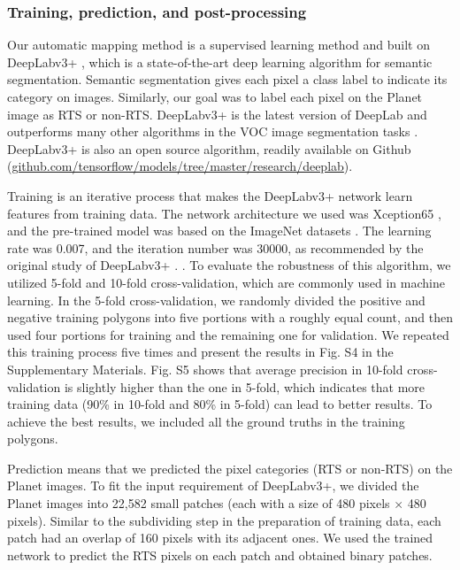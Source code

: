 \documentclass[authoryear,preprint,review,12pt]{elsarticle}
\begin{document}
\subsubsection{Training, prediction, and post-processing}
\label{subsubsec_deeplab}

Our automatic mapping method is a supervised learning method and built on DeepLabv3+ \citep{chen_encoder-decoder_2018}, which is a state-of-the-art deep learning algorithm for semantic segmentation. Semantic segmentation gives each pixel a class label to indicate its category on images. Similarly, our goal was to label each pixel on the Planet image as RTS or non-RTS. DeepLabv3+ is the latest version of DeepLab and outperforms  many other algorithms in the  VOC image segmentation tasks \citep{everingham_pascal_2015}. DeepLabv3+ is also an open source algorithm, readily available on Github (\url{github.com/tensorflow/models/tree/master/research/deeplab}).

Training is an iterative process that makes the DeepLabv3+ network learn features from training data. The network architecture we used was Xception65 \citep{chollet2017xception}, and the pre-trained model was based on the ImageNet datasets \citep{russakovsky2015imagenet}. The learning rate was 0.007, and the iteration number was 30000, as recommended by the original study of DeepLabv3+ \citep{chen_encoder-decoder_2018}. . To evaluate the robustness of this algorithm, we utilized 5-fold and 10-fold cross-validation, which are commonly used in machine learning. In the 5-fold cross-validation, we randomly divided the positive and negative training polygons into five portions with a roughly equal count, and then used four portions for training and the remaining one for validation. We repeated this training process five times and present the results in Fig. S4 in the Supplementary Materials. Fig. S5 shows that average precision in 10-fold cross-validation is slightly higher than the one in 5-fold, which indicates that more training data (90\% in 10-fold and 80\% in 5-fold) can lead to better results. To achieve the best results, we included all the ground truths in the training polygons. 

Prediction means that we predicted the pixel categories (RTS or non-RTS) on the Planet images. To fit the input requirement of DeepLabv3+, we divided the Planet images into 22,582 small patches (each with a size of 480 pixels $\times$ 480 pixels). Similar to the subdividing step in the preparation of training data, each patch had an overlap of 160 pixels with its adjacent ones. We used the trained network to predict the RTS pixels on each patch and obtained binary patches. 
\end{document}
